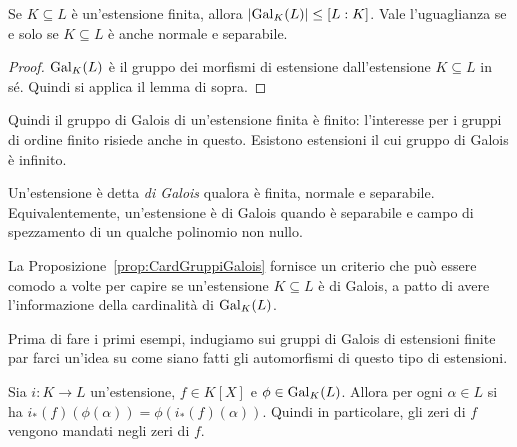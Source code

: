 \begin{prop}\label{prop:CardGruppiGalois}
Se $K \subseteq L$ è un'estensione finita, allora $\card{\Gal[K]{L}} \le [L:K]$. Vale l'uguaglianza se e solo se $K \subseteq L$ è anche normale e separabile.
\end{prop}

\begin{proof}
$\Gal[K]{L}$ è il gruppo dei morfismi di estensione dall'estensione $K \subseteq L$ in sé. Quindi si applica il lemma di sopra. 
\end{proof}

Quindi il gruppo di Galois di un'estensione finita è finito: l'interesse per i gruppi di ordine finito risiede anche in questo. Esistono estensioni il cui gruppo di Galois è infinito. 

\begin{esem}[$\Q \subseteq \bar\Q$]
\end{esem}



\begin{defi}
Un'estensione è detta {\em di Galois} qualora è finita, normale e separabile. Equivalentemente, un'estensione è di Galois quando è separabile e campo di spezzamento di un qualche polinomio non nullo.
\end{defi}

La Proposizione~\ref{prop:CardGruppiGalois} fornisce un criterio che può essere comodo a volte per capire se un'estensione $K \subseteq L$ è di Galois, a patto di avere l'informazione della cardinalità di $\Gal[K]{L}$.

Prima di fare i primi esempi, indugiamo sui gruppi di Galois di estensioni finite par farci un'idea su come siano fatti gli automorfismi di questo tipo di estensioni.

\begin{lemm}
Sia $i : K \to L$ un'estensione, $f \in K[X]$ e $\phi \in \Gal[K]{L}$. Allora per ogni $\alpha \in L$ si ha $i_\ast(f)(\phi(\alpha)) = \phi\left(i_\ast(f)(\alpha)\right)$. Quindi in particolare, gli zeri di $f$ vengono mandati negli zeri di $f$.
\end{lemm}

